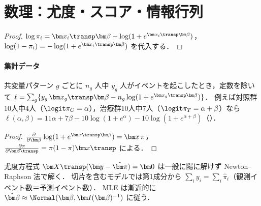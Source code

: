 \section{数理：尤度・スコア・情報行列}\label{sec:06-likelihood}
\begin{proof}
$\log\pi_i=\bm x_i\transp\bm\beta-\log(1+e^{\bm x_i\transp\bm\beta})$，$\log(1-\pi_i)=-\log(1+e^{\bm x_i\transp\bm\beta})$ を代入する．
\end{proof}
\paragraph{集計データ}
共変量パターン $g$ ごとに $n_g$ 人中 $y_g$ 人がイベントを起こしたとき，定数を除いて
$\ell=\sum_g\{y_g\,\bm x_g\transp\bm\beta-n_g\log(1+e^{\bm x_g\transp\bm\beta})\}$．
例えば対照群10人中4人（$\logit\pi_C=\alpha$），治療群10人中7人（$\logit\pi_T=\alpha+\beta$）なら
$\ell(\alpha,\beta)=11\alpha+7\beta-10\log(1+e^\alpha)-10\log(1+e^{\alpha+\beta})$（）．

\begin{proof}
$\frac{\partial}{\partial\bm\beta}\log(1+e^{\bm x\transp\bm\beta})=\bm x\,\pi$，$\frac{\partial\pi}{\partial\bm\beta\transp}=\pi(1-\pi)\bm x\transp$ による．
\end{proof}
尤度方程式 $\bm X\transp(\bm y-\hat{\bm\pi})=\bm0$ は一般に陽に解けず Newton--Raphson 法で解く．
切片を含むモデルでは第1成分から $\sum_iy_i=\sum_i\hat\pi_i$（観測イベント数＝予測イベント数）．
MLE は漸近的に $\hat{\bm\beta}\approx\Normal(\bm\beta,\bm I(\bm\beta)^{-1})$ に従う．


